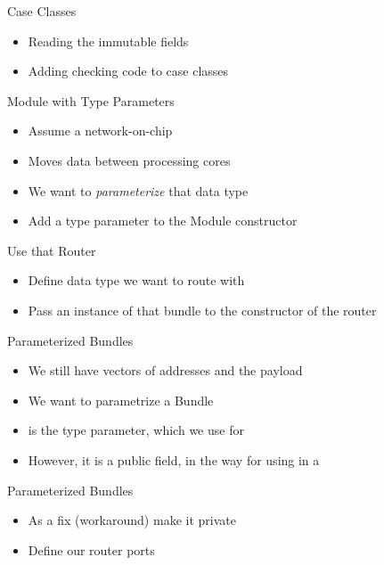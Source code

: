 \begin{frame}[fragile]{Case Classes}
\begin{itemize}
\item Reading the immutable fields
\item Adding checking code to case classes
\end{itemize}
\end{frame}

\begin{frame}[fragile]{Module with Type Parameters}
\begin{itemize}
\item Assume a network-on-chip
\item Moves data between processing cores
\item We want to \emph{parameterize} that data type
\item Add a type parameter  to the Module constructor
\end{itemize}


\end{frame}
\begin{frame}[fragile]{Use that Router}
\begin{itemize}
\item Define data type we want to route with
\item Pass an instance of that bundle to the constructor of the router
\end{itemize}
\end{frame}




\begin{frame}[fragile]{Parameterized Bundles}
\begin{itemize}
\item We still have vectors of addresses and the payload
\item We want to parametrize a Bundle
\item {} is the type parameter, which we use for 
\item However, it is a public field, in the way for using in a 
\end{itemize}
\end{frame}


\begin{frame}[fragile]{Parameterized Bundles}
\begin{itemize}
\item As a fix (workaround) make it private
\item Define our router ports
\end{itemize}
\end{frame}


